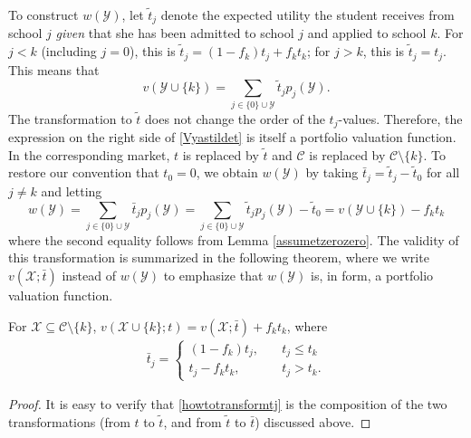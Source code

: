 To construct $w(\mathcal{Y})$, let $\tilde t_j$ denote the expected utility the student receives from school $j$ \emph{given} that she has been admitted to school $j$ and applied to school $k$. For $j < k$ (including $j = 0$), this is $\tilde t_j = (1- f_k) t_j + f_k t_k$; for $j > k $, this is $\tilde t_j = t_j$. This means that 
\begin{equation}\label{Vyastildet}
v(\mathcal{Y}\cup\{k\}) = \sum_{j \in \{0\} \cup \mathcal{Y}} \tilde t_j p_j(\mathcal{Y}).\end{equation}
The transformation to $\tilde t$ does not change the order of the $t_j$-values. Therefore, the expression on the right side of \eqref{Vyastildet} is itself a portfolio valuation function. In the corresponding market, $t$ is replaced by $\tilde t$ and $\mathcal{C}$ is replaced by $\mathcal{C}\setminus\{k\}$. To restore our convention that $t_0 = 0$, we obtain $w(\mathcal{Y})$ by taking $\bar t_j = \tilde t_j - \tilde t_0$ for all $j \neq k$ and letting
\begin{equation}  \label{wYvXminusconst}
w(\mathcal{Y})
= \sum_{j \in \{0\} \cup \mathcal{Y}} \bar t_j p_j(\mathcal{Y})
= \sum_{j \in \{0\} \cup \mathcal{Y}} \tilde t_j p_j(\mathcal{Y})- \tilde t_0
= v(\mathcal{Y}\cup\{k\}) -  f_k t_k \end{equation}
where the second equality follows from Lemma \ref{assumetzerozero}. The validity of this transformation is summarized in the following theorem, where we write $v(\mathcal{X}; \bar t)$ instead of $w(\mathcal{Y})$ to emphasize that $w(\mathcal{Y})$ is, in form, a portfolio valuation function. 


\begin{lemma} \label{eliminationtheorem}
For $\mathcal{X} \subseteq \mathcal{C} \setminus \{k\}$, $v(\mathcal{X}\cup\{k\}; t)  = v(\mathcal{X}; \bar t) + f_k t_k$, where
\begin{align}\label{howtotransformtj}
\bar t_j = 
\begin{cases}
(1 - f_k) t_j, \quad & t_j \leq t_k \\
t_j - f_k t_k, \quad& t_j > t_k.
\end{cases}
\end{align}
\end{lemma}

\begin{proof}
It is easy to verify that \eqref{howtotransformtj} is the composition of the two transformations (from $t$ to $\tilde t$, and from $\tilde t$ to $\bar t$) discussed above.
\end{proof}


